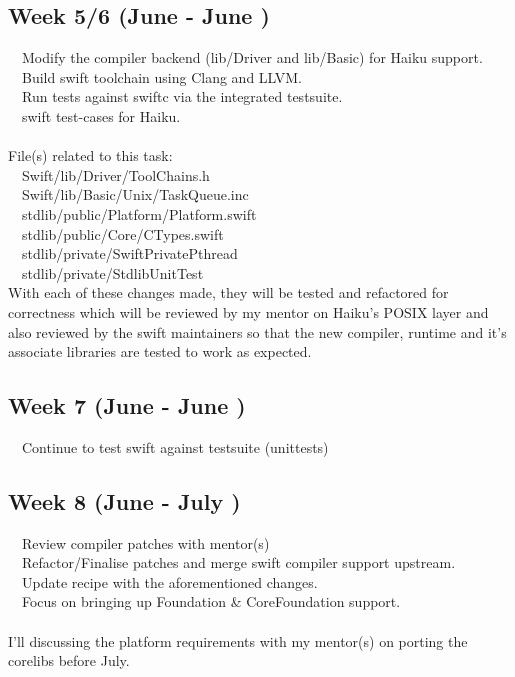 \documentclass[12pt]{article}
\begin{document}
\subsection*{Week 5/6 (June  - June )}
\textbullet \ \ Modify the compiler backend (lib/Driver and lib/Basic) for Haiku support.\\
\textbullet \ \ Build swift toolchain using Clang and LLVM.\\
\textbullet \ \ Run tests against swiftc via the integrated testsuite. \\
\textbullet \ \  swift test-cases for Haiku.\\
\\
File(s) related to this task: \\
\textbullet \ \ Swift/lib/Driver/ToolChains.h \\
\textbullet \ \ Swift/lib/Basic/Unix/TaskQueue.inc  \\
\textbullet \ \ stdlib/public/Platform/Platform.swift  \\
\textbullet \ \ stdlib/public/Core/CTypes.swift  \\
\textbullet \ \ stdlib/private/SwiftPrivatePthread \\
\textbullet \ \ stdlib/private/StdlibUnitTest  \\


With each of these changes made, they will be tested and refactored for correctness which will be reviewed by my mentor on Haiku's POSIX layer and also reviewed by the swift maintainers so that the new compiler, runtime and it's associate libraries are tested to work as expected.

\subsection*{Week 7 (June  - June )}

\textbullet \ \ Continue to test swift against testsuite (unittests)

\subsection*{Week 8 (June  - July )}
\textbullet \ \ Review compiler patches with mentor(s) \\
\textbullet \ \ Refactor/Finalise patches and merge swift compiler support upstream.\\
\textbullet \ \ Update recipe with the aforementioned changes.\\
\textbullet \ \ Focus on bringing up Foundation \& CoreFoundation support.\\
\\
I'll discussing the platform requirements with my mentor(s) on porting the corelibs before July.
\end{document}
